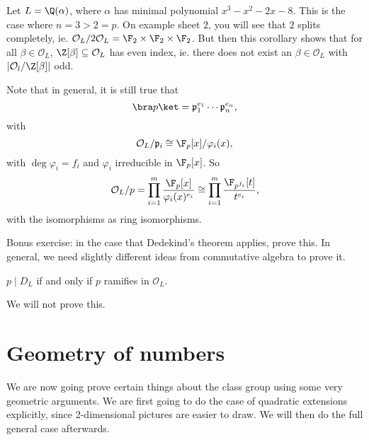 \documentclass[a4paper]{article}
\begin{document}
\begin{eg}
  Let $L = \Q(\alpha)$, where $\alpha$ has minimal polynomial $x^3 - x^2 - 2x - 8$. This is the case where $n = 3 > 2 = p$. On example sheet $2$, you will see that $2$ splits completely, ie. $\mathcal{O}_L/2\mathcal{O}_L = \F_2 \times \F_2 \times \F_2$. But then this corollary shows that for all $\beta \in \mathcal{O}_L$, $\Z[\beta] \subseteq \mathcal{O}_L$ has even index, ie. there does not exist an $\beta \in \mathcal{O}_L$ with $|\mathcal{O}_l/\Z[\beta]|$ odd.
\end{eg}

Note that in general, it is still true that
\[
  \bra p\ket = \mathfrak{p}_1^{e_1} \cdots \mathfrak{p}_n^{e_n},
\]
with
\[
  \mathcal{O}_L/\mathfrak{p}_i \cong \F_p[x] / \varphi_i(x),
\]
with $\deg \varphi_i = f_i$ and $\varphi_i$ irreducible in $\F_p[x]$. So
\[
  \mathcal{O}_L/p = \prod_{i = 1}^m \frac{\F_p[x]}{\varphi_i(x)^{e_i}} \cong \prod_{i = 1}^m \frac{\F_{p^{f_i}}[t]}{t^{e_i}},
\]
with the isomorphisms as ring isomorphisms.

Bonus exercise: in the case that Dedekind's theorem applies, prove this. In general, we need slightly different ideas from commutative algebra to prove it. %

\begin{thm}
  $p \mid D_L$ if and only if $p$ ramifies in $\mathcal{O}_L$.
\end{thm}

We will not prove this.

\section{Geometry of numbers}
We are now going prove certain things about the class group using some very geometric arguments. We are first going to do the case of quadratic extensions explicitly, since 2-dimensional pictures are easier to draw. We will then do the full general case afterwards.
\end{document}
